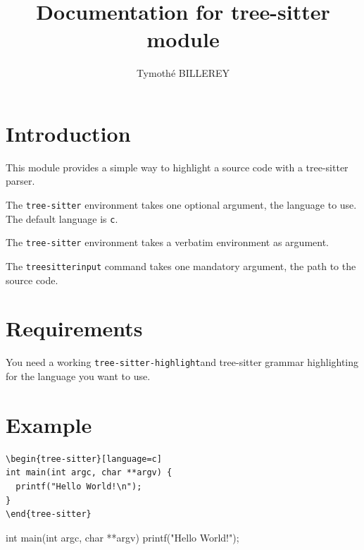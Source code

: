 \documentclass{article}
\begin{document}
\title{Documentation for tree-sitter module}
\author{Tymothé BILLEREY}
\maketitle

\section{Introduction}

This module provides a simple way to highlight a source code with a tree-sitter
parser.

The \verb|tree-sitter| environment takes one optional argument, the language to
use.
The default language is \verb|c|.

The \verb|tree-sitter| environment takes a verbatim environment as argument.

The \verb|treesitterinput| command takes one mandatory argument, the path to the
source code.

\section{Requirements}

You need a working \verb|tree-sitter-highlight|\footnotemark[1] and tree-sitter
grammar highlighting for the language you want to use.


\section{Example}

\begin{verbatim}
\begin{tree-sitter}[language=c]
int main(int argc, char **argv) {
  printf("Hello World!\n");
}
\end{tree-sitter}
\end{verbatim}
\begin{tree-sitter}[language=c]
int main(int argc, char **argv) {
  printf("Hello World!\n");
}
\end{tree-sitter}
\end{document}

